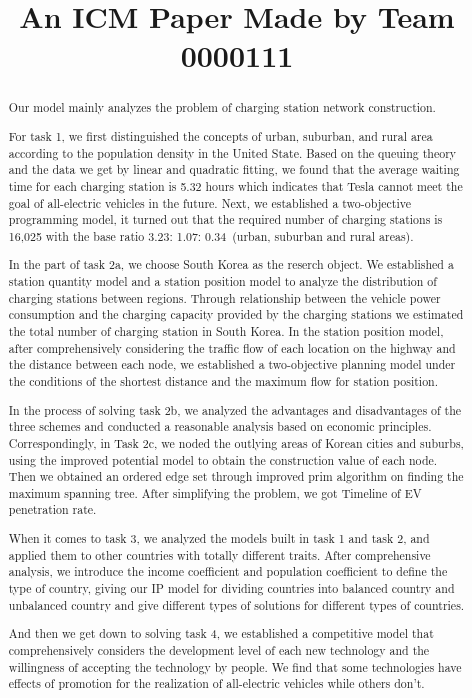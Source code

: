 \documentclass[12pt]{article}  %
\title{An ICM Paper Made by Team 0000111}  %
\begin{document}
\begin{abstract}
Our model mainly analyzes the problem of charging station network construction.
	
For task 1, we first distinguished the concepts of urban, suburban, and rural area according to the population density in the United State. Based on the queuing theory and the data we get by linear and quadratic fitting, we found that the average waiting time for each charging station is 5.32 hours which indicates that Tesla cannot meet the goal of all-electric vehicles in the future. Next, we established a two-objective programming model, it turned out that the required number of charging stations is 16,025 with the base ratio 3.23: 1.07: 0.34\ (urban, suburban and rural areas). 

In the part of task 2a, we choose South Korea as the reserch object. We established a station quantity model and a station position model to analyze the distribution of charging stations between regions. Through relationship between the vehicle power consumption and the charging capacity provided by the charging stations we estimated the total number of charging station in South Korea. In the station position model, after comprehensively considering the traffic flow of each location on the highway and the distance between each node, we established a two-objective planning model under the conditions of the shortest distance and the maximum flow for station position.

In the process of solving task 2b, we analyzed the advantages and disadvantages of the three schemes and conducted a reasonable analysis based on economic principles. Correspondingly, in Task 2c, we noded the outlying areas of Korean cities and suburbs, using the improved potential model to obtain the construction value of each node. Then we obtained an ordered edge set through improved prim algorithm on finding the maximum spanning tree. After simplifying the problem, we got Timeline of EV penetration rate.

When it comes to task 3, we analyzed the models built in task 1 and task 2, and applied them to other countries with totally different traits. After comprehensive analysis, we introduce the income coefficient and population coefficient to define the type of country, giving our IP model for dividing countries into balanced country and unbalanced country and give different types of solutions for different types of countries.

And then we get down to solving task 4, we established a competitive model that comprehensively considers the development level of each new technology and the willingness of accepting the technology by people. We find that some technologies have effects of promotion for the realization of all-electric vehicles while others don't. 


\end{abstract}
\end{document}
